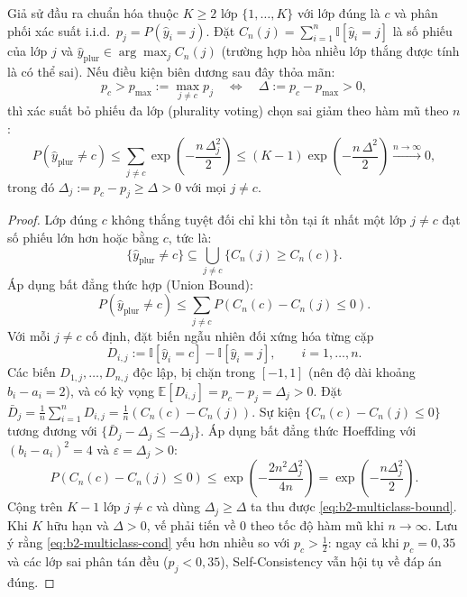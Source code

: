 \begin{theorem}
\label{thm:b2-multiclass}
Giả sử đầu ra chuẩn hóa thuộc $K \ge 2$ lớp $\{1, \dots, K\}$ với lớp đúng là $c$ và phân phối xác suất i.i.d.\ $p_j = P(\hat{y}_i = j)$. Đặt $C_n(j) = \sum_{i=1}^n \mathbb{I}[\hat{y}_i = j]$ là số phiếu của lớp $j$ và $\hat{y}_{\text{plur}} \in \arg\max_j C_n(j)$ (trường hợp hòa nhiều lớp thắng được tính là có thể sai). Nếu điều kiện biên dương sau đây thỏa mãn:
\begin{equation}
  p_c > p_{\max} := \max_{j \neq c} p_j \quad \Longleftrightarrow \quad \Delta := p_c - p_{\max} > 0,
  \label{eq:b2-multiclass-cond}
\end{equation}
thì xác suất bỏ phiếu đa lớp (plurality voting) chọn sai giảm theo hàm mũ theo $n$:
\begin{equation}
  P(\hat{y}_{\text{plur}} \neq c) \le \sum_{j \neq c} \exp\!\left(-\frac{n \, \Delta_j^2}{2}\right) \le (K - 1)\exp\!\left(-\frac{n \, \Delta^2}{2}\right) \xrightarrow{n \to \infty} 0,
  \label{eq:b2-multiclass-bound}
\end{equation}
trong đó $\Delta_j := p_c - p_j \ge \Delta > 0$ với mọi $j \neq c$.
\end{theorem}

\begin{proof}
Lớp đúng $c$ không thắng tuyệt đối chỉ khi tồn tại ít nhất một lớp $j \neq c$ đạt số phiếu lớn hơn hoặc bằng $c$, tức là:
\[
  \{\hat{y}_{\text{plur}} \neq c\} \subseteq \bigcup_{j \neq c} \{C_n(j) \ge C_n(c)\}.
\]
Áp dụng bất đẳng thức hợp (Union Bound):
\[
  P(\hat{y}_{\text{plur}} \neq c) \le \sum_{j \neq c} P(C_n(c) - C_n(j) \le 0).
\]
Với mỗi $j \neq c$ cố định, đặt biến ngẫu nhiên đối xứng hóa từng cặp
\[
  D_{i,j} := \mathbb{I}[\hat{y}_i = c] - \mathbb{I}[\hat{y}_i = j], \qquad i = 1, \dots, n.
\]
Các biến $D_{1,j}, \dots, D_{n,j}$ độc lập, bị chặn trong $[-1, 1]$ (nên độ dài khoảng $b_i - a_i = 2$), và có kỳ vọng $\mathbb{E}[D_{i,j}] = p_c - p_j = \Delta_j > 0$. Đặt $\bar{D}_j = \frac{1}{n}\sum_{i=1}^n D_{i,j} = \frac{1}{n}(C_n(c) - C_n(j))$. Sự kiện $\{C_n(c) - C_n(j) \le 0\}$ tương đương với $\{\bar{D}_j - \Delta_j \le -\Delta_j\}$. Áp dụng bất đẳng thức Hoeffding với $(b_i - a_i)^2 = 4$ và $\varepsilon = \Delta_j > 0$:
\[
  P(C_n(c) - C_n(j) \le 0) \le \exp\!\left(-\frac{2n^2 \Delta_j^2}{4n}\right) = \exp\!\left(-\frac{n \Delta_j^2}{2}\right).
\]
Cộng trên $K - 1$ lớp $j \neq c$ và dùng $\Delta_j \ge \Delta$ ta thu được \eqref{eq:b2-multiclass-bound}. Khi $K$ hữu hạn và $\Delta > 0$, vế phải tiến về $0$ theo tốc độ hàm mũ khi $n \to \infty$. Lưu ý rằng \eqref{eq:b2-multiclass-cond} yếu hơn nhiều so với $p_c > \tfrac{1}{2}$: ngay cả khi $p_c = 0{,}35$ và các lớp sai phân tán đều ($p_j < 0{,}35$), Self-Consistency vẫn hội tụ về đáp án đúng.
\end{proof}

